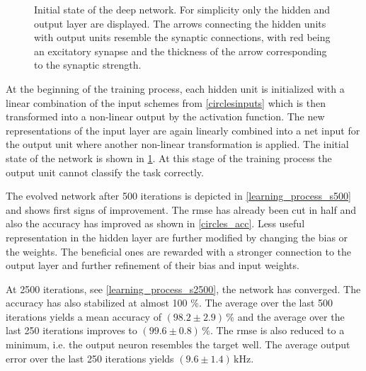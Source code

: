 \begin{figure}
	
	\caption[Initial state of the deep network.]{Initial state of the deep network. For simplicity only the hidden and output layer are displayed. The arrows connecting the hidden units with output units resemble the synaptic connections, with red being an excitatory synapse and the thickness of the arrow corresponding to the synaptic strength.}
	\label{learning_process_s5}
\end{figure}

At the beginning of the training process, each hidden unit is initialized with a linear combination of the input schemes from \cref{circlesinputs} which is then transformed into a non-linear output by the activation function. The new representations of the input layer are again linearly combined into a net input for the output unit where another non-linear transformation is applied. The initial state of the network is shown in \cref{learning_process_s5}. At this stage of the training process the output unit cannot classify the task correctly. 

%	

The evolved network after 500 iterations is depicted in \cref{learning_process_s500} and shows first signs of improvement. The \gls{rmse} has already been cut in half and also the accuracy has improved as shown in \cref{circles_acc}. Less useful representation in the hidden layer are further modified by changing the bias or the weights. The beneficial ones are rewarded with a stronger connection to the output layer and further refinement of their bias and input weights.

At 2500 iterations, see \cref{learning_process_s2500}, the network has converged. The accuracy has also stabilized at almost 100 \%. The average over the last 500 iterations yields a mean accuracy of $(98.2 \pm 2.9)\,\%$ and the average over the last 250 iterations improves to  $(99.6 \pm 0.8)\,\%$. The \gls{rmse} is also reduced to a minimum, i.e. the output neuron resembles the target well. The average output error over the last 250 iterations yields $(9.6 \pm 1.4)\,\si{\kilo \Hz}$.

